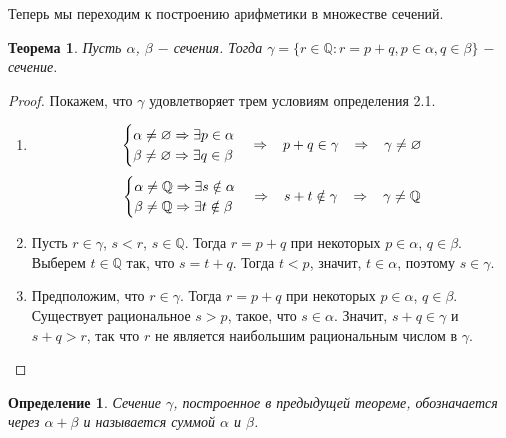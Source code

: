 \documentclass{article}
\newtheorem{theorem}{Теорема}[section]
\newtheorem{definition}{Определение}[section]
\begin{document}
Теперь мы переходим к построению арифметики в множестве сечений.

\begin{theorem}
Пусть \(\alpha\), \(\beta\) \(-\) сечения. Тогда
\(\gamma = \{r \in \mathbb{Q} : r = p + q, p \in \alpha, q \in \beta\}\) \(-\) сечение.
\end{theorem}

\begin{proof}
Покажем, что \(\gamma\) удовлетворяет трем условиям определения 2.1.
\renewcommand{\labelenumi}{\Roman{enumi}}
\begin{enumerate}
	\item
\[
\begin{cases}
    \alpha \neq \varnothing \Rightarrow \exists p \in \alpha \\
    \beta \neq \varnothing \Rightarrow \exists q \in \beta
\end{cases}
\Rightarrow \hspace{3mm}
p + q \in \gamma \hspace{3mm}
\Rightarrow \hspace{3mm}
\gamma \neq \varnothing
\]
\[
\begin{cases}
    \alpha \neq \mathbb{Q} \Rightarrow \exists s \notin \alpha \\
    \beta \neq \mathbb{Q} \Rightarrow \exists t \notin \beta
\end{cases}
\Rightarrow \hspace{3mm}
s + t \notin \gamma \hspace{3mm}
\Rightarrow \hspace{3mm}
\gamma \neq \mathbb{Q}
\]
    \item Пусть \(r \in \gamma\), \(s < r\), \(s \in  \mathbb{Q}\). Тогда \(r = p + q\) при некоторых \(p \in \alpha\), \(q \in \beta\). Выберем \(t \in \mathbb{Q}\) так, что \(s = t + q\). Тогда \(t < p\), значит, \(t \in \alpha\), поэтому \(s \in \gamma\).
    \item Предположим, что \(r \in \gamma\). Тогда \(r = p + q\) при некоторых \(p \in \alpha\), \(q \in \beta\). Существует рациональное \(s > p\), такое, что \(s \in \alpha\). Значит, \(s + q \in \gamma\) и \(s + q > r\), так что \(r\) не является наибольшим рациональным числом в \(\gamma\).
\end{enumerate}
\end{proof}

\begin{definition}
Сечение \(\gamma\), построенное в предыдущей теореме, обозначается через \(\alpha + \beta\) и называется суммой \(\alpha\) и \(\beta\).
\end{definition}
\end{document}
